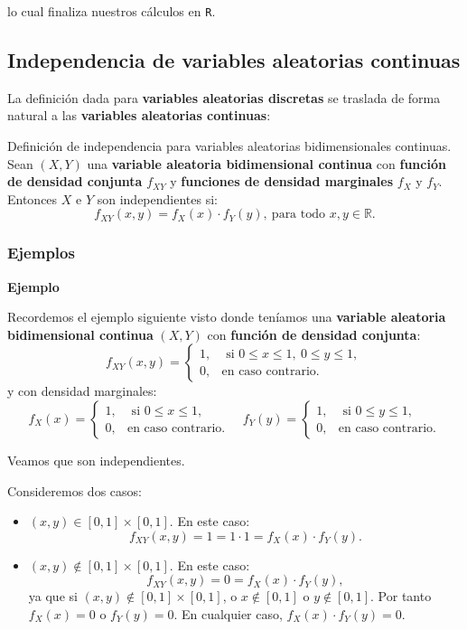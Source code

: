 \documentclass[]{book}
\begin{document}
lo cual finaliza nuestros cálculos en \texttt{R}.

\hypertarget{independencia-de-variables-aleatorias-continuas}{%
\subsection{Independencia de variables aleatorias continuas}\label{independencia-de-variables-aleatorias-continuas}}

La definición dada para \textbf{variables aleatorias discretas} se traslada de forma natural a las \textbf{variables aleatorias continuas}:

Definición de independencia para variables aleatorias bidimensionales continuas.
Sean \((X,Y)\) una \textbf{variable aleatoria bidimensional continua} con \textbf{función de densidad conjunta} \(f_{XY}\) y \textbf{funciones de densidad marginales} \(f_X\) y \(f_Y\). Entonces \(X\) e \(Y\) son independientes si:
\[
f_{XY}(x,y)=f_X(x)\cdot f_Y(y),\ \mbox{para todo $x,y\in\mathbb{R}$.}
\]

\hypertarget{ejemplos-5}{%
\subsubsection{Ejemplos}\label{ejemplos-5}}

\textbf{Ejemplo}

Recordemos el ejemplo siguiente visto donde teníamos una \textbf{variable aleatoria bidimensional continua} \((X,Y)\) con \textbf{función de densidad conjunta}:
\[
f_{XY}(x,y)=\begin{cases}
1, & \mbox{ si }0\leq x\leq 1,\ 0\leq y\leq 1, \\
0, & \mbox{en caso contrario.}
\end{cases}
\]
y con densidad marginales:
\[
f_{X}(x)=\begin{cases}
1, & \mbox{ si }0\leq x\leq 1,\\
0, & \mbox{en caso contrario.}
\end{cases}\quad f_{Y}(y)=\begin{cases}
1, & \mbox{ si }0\leq y\leq 1,\\
0, & \mbox{en caso contrario.}
\end{cases}
\]

Veamos que son independientes.

Consideremos dos casos:

\begin{itemize}
\item
  \((x,y)\in [0,1]\times [0,1]\). En este caso:
  \[
  f_{XY}(x,y) =1 =1\cdot 1=f_X(x)\cdot f_Y(y).
  \]
\item
  \((x,y)\not\in [0,1]\times [0,1]\). En este caso:
  \[
  f_{XY}(x,y) =0 = f_X(x)\cdot f_Y(y),
  \]
  ya que si \((x,y)\not\in [0,1]\times [0,1]\), o \(x\not\in [0,1]\) o \(y\not\in [0,1]\). Por tanto \(f_X(x)=0\) o \(f_Y(y)=0\). En cualquier caso, \(f_X(x)\cdot f_Y(y)=0\).
\end{itemize}
\end{document}
